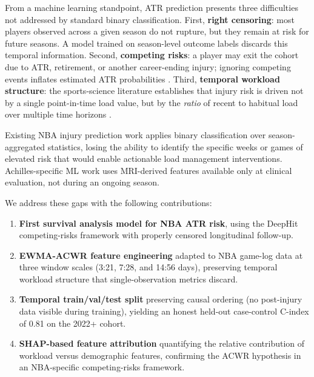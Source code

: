 \documentclass{article}
\begin{document}
From a machine learning standpoint, ATR prediction presents three difficulties
not addressed by standard binary classification.  First, \textbf{right
censoring}: most players observed across a given season do not rupture, but
they remain at risk for future seasons.  A model trained on season-level
outcome labels discards this temporal information.  Second, \textbf{competing
risks}: a player may exit the cohort due to ATR, retirement, or another
career-ending injury; ignoring competing events inflates estimated ATR
probabilities \citep{lee2018deephit}.  Third, \textbf{temporal workload
structure}: the sports-science literature establishes that injury risk is
driven not by a single point-in-time load value, but by the \emph{ratio} of
recent to habitual load over multiple time horizons \citep{gabbett2016}.

Existing NBA injury prediction work \citep{cohan2021,lu2022} applies binary
classification over season-aggregated statistics, losing the ability to
identify the specific weeks or games of elevated risk that would enable
actionable load management interventions.  Achilles-specific ML work
\citep{kapinski2024} uses MRI-derived features available only at clinical
evaluation, not during an ongoing season.

We address these gaps with the following contributions:
\begin{enumerate}\itemsep0pt
  \item \textbf{First survival analysis model for NBA ATR risk}, using the
        DeepHit competing-risks framework \citep{lee2018deephit} with
        properly censored longitudinal follow-up.
  \item \textbf{EWMA-ACWR feature engineering} adapted to NBA game-log data at
        three window scales (3:21, 7:28, and 14:56 days), preserving temporal
        workload structure that single-observation metrics discard.
  \item \textbf{Temporal train/val/test split} preserving causal ordering (no
        post-injury data visible during training), yielding an honest held-out
        case-control C-index of 0.81 on the 2022+ cohort.
  \item \textbf{SHAP-based feature attribution} quantifying the relative
        contribution of workload versus demographic features, confirming the
        ACWR hypothesis in an NBA-specific competing-risks framework.
\end{enumerate}

\end{document}

